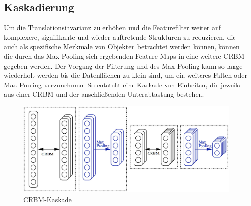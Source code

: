 \subsection{Kaskadierung}
Um die Translationsinvarianz zu erhöhen und die Featurefilter weiter auf komplexere, signifikante und wieder auftretende Strukturen zu reduzieren, die auch als spezifische Merkmale von Objekten betrachtet werden können, können die durch das Max-Pooling sich ergebenden Feature-Maps in eine weitere CRBM gegeben werden. 
Der Vorgang der Filterung und des Max-Pooling kann so lange wiederholt werden bis die Datenflächen zu klein sind, um ein weiteres Falten oder Max-Pooling vorzunehmen.
So entsteht eine Kaskade von Einheiten, die jeweils aus einer CRBM und der anschließenden Unterabtastung bestehen.\newline
\begin{figure}[]
                \centering
                \includegraphics[width=2.0\columnwidth]{images/stack.jpg}
                \caption{CRBM-Kaskade \cite{Norouzi09}}
                \label{cascade}
\end{figure}
